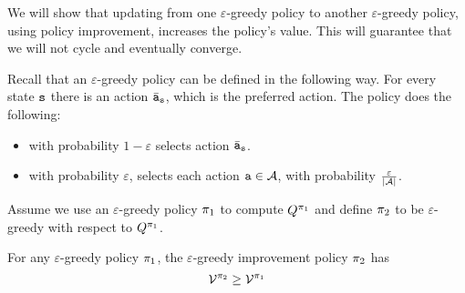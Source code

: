 We will show that updating from one $\varepsilon$-greedy policy to
another $\varepsilon$-greedy policy, using policy improvement, increases the policy's value. 
This will guarantee that we will not cycle and eventually converge.

Recall that an $\varepsilon$-greedy policy can be defined in the
following way. For every state ${\tt s}$ there is an action
$\bar{{\tt a}}_{\tt s}$, which is the preferred action. The policy
does the following:
\begin{itemize}
    \item with probability $1-\varepsilon$ selects action $\bar{{\tt a}}_{\tt s}$.
    \item with probability $\varepsilon$, selects each action ${\tt a} \in \mathcal{A}$, with probability 
 $\frac{\varepsilon}{|\mathcal{A}|}$.
\end{itemize}

Assume we use an $\varepsilon$-greedy policy $\pi_1$ to compute
$Q^{\pi_1}$ and define $\pi_2$ to be $\varepsilon$-greedy
with respect to $Q^{\pi_1}$.

\begin{theorem}
For any $\varepsilon$-greedy policy $\pi_1$, the
$\varepsilon$-greedy improvement policy $\pi_2$ has
\[\mathcal{V}^{\pi_2}\geq \mathcal{V}^{\pi_1}\]
\end{theorem}

